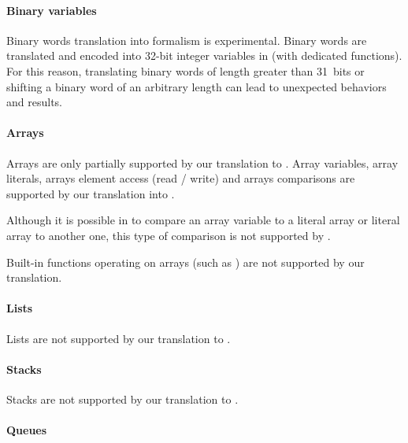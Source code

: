 \paragraph{Binary variables}

\begin{becareful}
Binary words translation into \uppaal{} formalism is experimental. Binary words are translated and encoded into 32-bit integer variables in \uppaal{} (with dedicated functions).
For this reason, translating binary words of length greater than 31~bits or shifting a binary word of an arbitrary length can lead to unexpected behaviors and results.
\end{becareful}

\paragraph{Arrays}

Arrays are only partially supported by our translation to \uppaal{}.
%
Array variables, array literals, arrays element access (read / write) and arrays comparisons are supported by our translation into \uppaal{}.

\begin{becareful}
	Although it is possible in \imitator{} to compare an array variable to a literal array or literal array to another one, this type of comparison is not supported by \uppaal{}.
\end{becareful}

\begin{becareful}
	Built-in functions operating on arrays (such as ) are not supported by our translation.
\end{becareful}

\paragraph{Lists}

Lists are not supported by our translation to \uppaal{}.

\paragraph{Stacks}

Stacks are not supported by our translation to \uppaal{}.

\paragraph{Queues}

